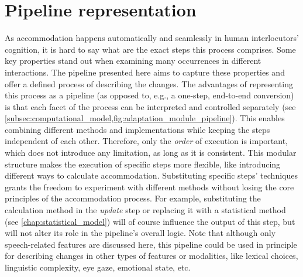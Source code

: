 \section{Pipeline representation}
\label{sec:pipeline_representation}

As accommodation  happens automatically and seamlessly in human interlocutors' cognition, it is hard to say what are the exact steps this process comprises.
Some key properties stand out when examining many occurrences in different interactions.
The pipeline presented here aims to capture these properties and offer a defined process of describing the changes.
The advantages of representing this process as a pipeline (as opposed to, e.g., a one-step, end-to-end conversion) is that each facet of the process can be interpreted and controlled separately (see \cref{subsec:computational_model,fig:adaptation_module_pipeline}).
This enables combining different methods and implementations while keeping the steps independent of each other.
Therefore, only the \emph{order} of execution is important, which does not introduce any limitation, as long as it is consistent.
This modular structure makes the execution of specific steps more flexible, like introducing different ways to calculate accommodation.
Substituting specific steps' techniques grants the freedom to experiment with different methods without losing the core principles of the accommodation process.
For example, substituting the calculation method in the \textit{update} step or replacing it with a statistical method (see \cref{chap:statistical_model})
will of course influence the output of this step, but will not alter its role in the pipeline's overall logic.
Note that although only speech-related features are discussed here, this pipeline could be used in principle for describing changes in other types of features or modalities, like lexical choices, linguistic complexity, eye gaze, emotional state, etc.

